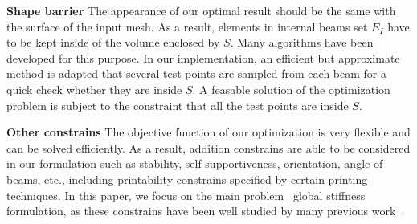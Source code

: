 \noindent\textbf{Shape barrier} The appearance of our optimal result should be the same with the surface of the input mesh. As a result, elements in internal beams set $E_I$ have to be kept inside of the volume enclosed by $S$. Many algorithms have been developed for this purpose. In our implementation, an efficient but approximate method is adapted that several test points are sampled from each beam for a quick check whether they are inside $S$. A feasable solution of the optimization problem is subject to the constraint that all the test points are inside $S$.



\noindent\textbf{Other constrains} The objective function of our optimization is very flexible and can be solved efficiently. As a result, addition constrains are able to be considered in our formulation such as stability, self-supportiveness, orientation, angle of beams, etc., including printability constrains specified by certain printing techniques. In this paper, we focus on the main problem \textendash \ global stiffness formulation, as these constrains have been well studied by many previous work~\cite{wang:2013}. 




%




